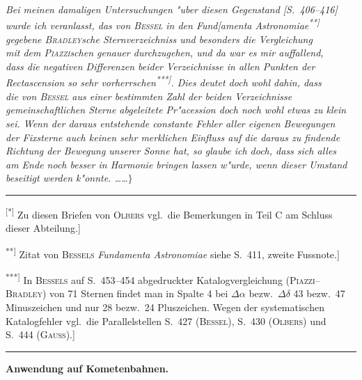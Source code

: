 \documentclass[12pt,a4paper]{article}
\theoremstyle{plain}
\theoremstyle{definition}
\theoremstyle{remark}
\begin{document}
{\itshape Bei meinen damaligen Untersuchungen "uber diesen Gegenstand [S.\ 406--416]} \\ {\itshape wurde ich veranlasst, das von \textsc{Bessel} in den Fund[amenta Astronomiae\textsuperscript{**]}} \\ {\itshape gegebene \textsc{Bradley}sche Sternverzeichniss und besonders die Vergleichung} \\ {\itshape mit dem \textsc{Piazzi}schen genauer durchzugehen, und da war es mir auffallend,} \\ {\itshape dass die negativen Differenzen beider Verzeichnisse in allen Punkten der} \\ {\itshape Rectascension so sehr vorherrschen\textsuperscript{***]}. Dies deutet doch wohl dahin, dass} \\ {\itshape die von \textsc{Bessel} aus einer bestimmten Zahl der beiden Verzeichnisse gemeinschaftlichen Sterne abgeleitete Pr"acession doch noch wohl etwas zu klein} \\ {\itshape sei. Wenn der daraus entstehende constante Fehler aller eigenen Bewegungen} \\ {\itshape der Fixsterne auch keinen sehr merklichen Einfluss auf die daraus zu findende} \\ {\itshape Richtung der Bewegung unserer Sonne hat, so glaube ich doch, dass sich alles} \\ {\itshape am Ende noch besser in Harmonie bringen lassen w"urde, wenn dieser Umstand} \\ {\itshape beseitigt werden k"onnte. \ldots{}\ldots{}}$\}$

\rule{\textwidth}{0.4pt}
{\small
\textsuperscript{[*]} Zu diesen Briefen von \textsc{Olbers} vgl.\ die Bemerkungen in Teil C am Schluss dieser Abteilung.]

\textsuperscript{**]} Zitat von \textsc{Bessels} {\itshape Fundamenta Astronomiae} siehe S.\ 411, zweite Fussnote.]

\textsuperscript{***]} In \textsc{Bessels} auf S.\ 453--454 abgedruckter Katalogvergleichung (\textsc{Piazzi}--\textsc{Bradley}) von 71 Sternen findet man in Spalte 4 bei $\Delta\alpha$ bezw.\ $\Delta\delta$ 43 bezw.\ 47 Minuszeichen und nur 28 bezw.\ 24 Pluszeichen. Wegen der systematischen Katalogfehler vgl.\ die Parallelstellen S.\ 427 (\textsc{Bessel}), S.\ 430 (\textsc{Olbers}) und S.\ 444 (\textsc{Gauss}).]
}
\rule{\textwidth}{0.4pt}


\newpage
\begin{center}
\textbf{Anwendung auf Kometenbahnen.}
\end{center}
\end{document}
